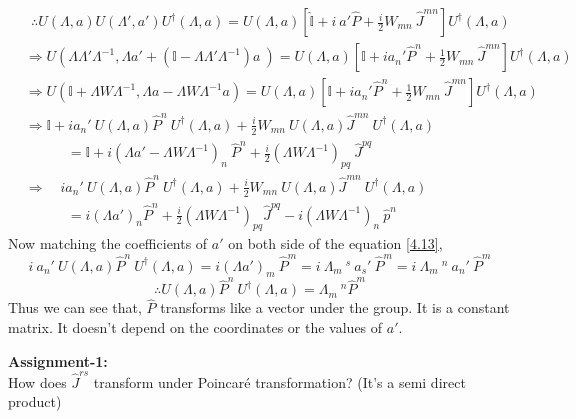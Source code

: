 \documentclass[14pt]{article} %
\begin{document}
\begin{align*}
&~~\therefore U(\Lambda, a) U(\Lambda', a') U^\dagger(\Lambda, a) = U(\Lambda, a) \left[ \hat{\mathbb{I}} + i~a'\hat{P} + \frac{i}{2} W_{mn} ~\hat{J}^{mn} \right] U^\dagger(\Lambda, a) \\
&\Rightarrow U\left(\Lambda \Lambda'\Lambda^{-1}, \Lambda a' + (\mathbb{I} - \Lambda \Lambda'\Lambda^{-1})a~ \right) = U(\Lambda, a)\left[\mathbb{I} + i a_n' \hat{P}^n + \frac{1}{2} W_{mn}~ \hat{J}^{mn}\right] U^\dagger(\Lambda, a) \\
&\Rightarrow U(\mathbb{I} + \Lambda W \Lambda^{-1}, \Lambda a - \Lambda W \Lambda^{-1}a) = U(\Lambda, a)\left[\mathbb{I} + i a_n' \hat{P}^n + \frac{1}{2} W_{mn}~ \hat{J}^{mn}\right] U^\dagger(\Lambda, a) \\
&\Rightarrow \mathbb{I} + i a_n' ~U(\Lambda, a) \hat{P}^n~ U^\dagger(\Lambda, a) + \frac{i}{2} W_{mn}~ U(\Lambda, a) \hat{J}^{mn}~U^\dagger(\Lambda, a) \\
& \quad \quad \quad= \mathbb{I} + i (\Lambda a'-\Lambda W \Lambda^{-1})_n ~\hat{P}^n + \frac{i}{2} (\Lambda W \Lambda^{-1})_{pq}~ \hat{J}^{pq} \tag{4.12}  \label{4.12}\\
&\Rightarrow\quad i a_n'~ U(\Lambda, a) \hat{P}^n~ U^\dagger(\Lambda, a) + \frac{i}{2} W_{mn} ~U(\Lambda, a) \hat{J}^{mn}~ U^\dagger(\Lambda, a) \\
& \quad \quad \quad= i {(\Lambda a')}_n \hat{P}^n + \frac{i}{2} {(\Lambda W \Lambda^{-1})}_{pq} \hat{J}^{pq} -i(\Lambda W \Lambda^{-1})_n~\hat{p}^n \tag{4.13}  \label{4.13}
\end{align*}
Now  matching the coefficients of $a'$ on both side of the equation \eqref{4.13},
\[
i ~a_n' ~U(\Lambda,a) \hat{P}^n ~U^\dagger(\Lambda, a) = i{(\Lambda a')}_m~\hat{P}^m = i~ \Lambda_m~^s~a_s'~\hat{P}^m = i~\Lambda_m~^n~a_n'~\hat{P}^m 
\]
\[
\boxed{\therefore U(\Lambda, a) \hat{P}^n~ U^\dagger(\Lambda, a) = \Lambda_m~^n\hat{P}^m}
\]
Thus we can see that, $\hat{P}$ transforms like a vector under the group. It is a constant matrix. It doesn't depend on the coordinates or the values of $a'$.
\begin{framed}
\noindent \textbf{Assignment-1:}\\
\noindent How does $\hat{J}^{rs}$ transform under Poincaré transformation? (It's a semi direct product)
\end{framed}
\vspace{-0.5cm}
\end{document}
